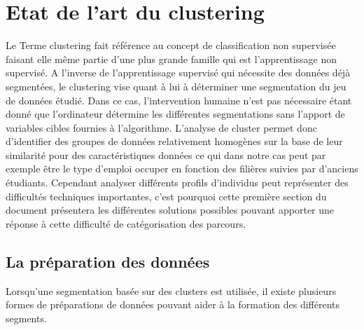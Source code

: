 \documentclass[memoire.tex]{subfiles}
\begin{document}
\chapter{Etat de l'art du clustering}
Le Terme clustering fait référence au concept de classification non supervisée faisant elle même partie d'une plus grande famille qui est l'apprentissage non supervisé. A l'inverse de l'apprentissage supervisé qui nécessite des données déjà segmentées, le clustering vise quant à lui à déterminer une segmentation du jeu de données étudié. Dans ce cas, l'intervention humaine n'est pas nécessaire étant donné  que l'ordinateur détermine les différentes segmentations sans l'apport de variables cibles fournies à l'algorithme.
L'analyse de cluster permet donc d'identifier des groupes de données relativement homogènes sur la base de leur similarité pour des caractéristiques données ce qui dans notre cas peut par exemple être le type d'emploi occuper en fonction des filières suivies par d'anciens étudiants. Cependant analyser différents profils d'individus peut représenter des difficultés techniques importantes, c'est pourquoi cette première section du document présentera les différentes solutions possibles pouvant apporter une réponse à cette difficulté de catégorisation des parcours.
\section{La préparation des données}
Lorsqu'une segmentation basée sur des clusters est utilisée, il existe plusieurs formes de préparations de données pouvant aider à la formation des différents segments. 
\end{document}
